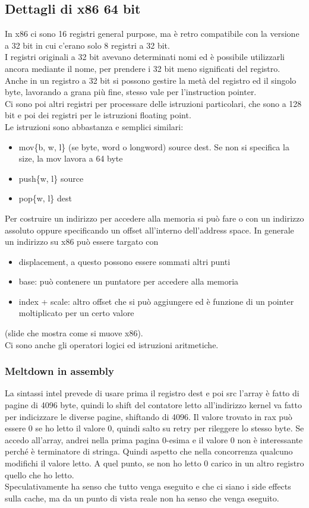 \documentclass[14pt]{article}
\begin{document}
\subsection{Dettagli di x86 64 bit}
In x86 ci sono 16 registri general purpose, ma è retro compatibile con la versione a 32 bit in cui c'erano solo 8 registri a 32 bit.\\ I registri originali a 32 bit avevano determinati nomi ed è possibile utilizzarli ancora mediante il nome, per prendere i 32 bit meno significati del registro. Anche in un registro a 32 bit si possono gestire la metà del registro ed il singolo byte, lavorando a grana più fine, stesso vale per l'instruction pointer.\\ Ci sono poi altri registri per processare delle istruzioni particolari, che sono a 128 bit e poi dei registri per le istruzioni floating point.\\ Le istruzioni sono abbastanza e semplici similari:
\begin{itemize}
\item \textsf{mov\{b, w, l\}} (se byte, word o longword) \textsf{source dest}. Se non si specifica la size, la mov lavora a 64 byte
\item \textsf{push\{w, l\} source}
\item \textsf{pop\{w, l\} dest}
\end{itemize}
Per costruire un indirizzo per accedere alla memoria si può fare o con un indirizzo assoluto oppure specificando un offset all'interno dell'address space. In generale un indirizzo su x86 può essere targato con
\begin{itemize}
\item displacement, a questo possono essere sommati altri punti
\item base: può contenere un puntatore per accedere alla memoria
\item index + scale: altro offset che si può aggiungere ed è funzione di un pointer moltiplicato per un certo valore 
\end{itemize}
(slide che mostra come si muove x86).\\ Ci sono anche gli operatori logici ed istruzioni aritmetiche.
\subsubsection{Meltdown in assembly}
La sintassi intel prevede di usare prima il registro dest e poi src
l'array è fatto di pagine di 4096 byte, quindi lo shift del contatore letto all'indirizzo kernel va fatto per indicizzare le diverse pagine, shiftando di 4096. Il valore trovato in rax può essere 0 se ho letto il valore 0, quindi salto su retry per rileggere lo stesso byte. Se accedo all'array, andrei nella prima pagina 0-esima e il valore 0 non è interessante perché è terminatore di stringa. Quindi aspetto che nella concorrenza qualcuno modifichi il valore letto. A quel punto, se non ho letto 0 carico in un altro registro quello che ho letto.\\ Speculativamente ha senso che tutto venga eseguito e che ci siano i side effects sulla cache, ma da un punto di vista reale non ha senso che venga eseguito.
\end{document}
